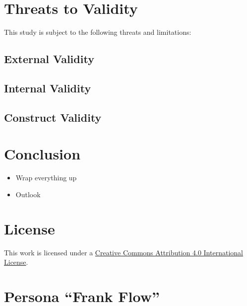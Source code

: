\documentclass[sigplan,screen,nonacm,review]{acmart}
\begin{document}
\section{Threats to Validity}
\label{sec:threats}

This study is subject to the following threats and limitations:

\subsection{External Validity}

\subsection{Internal Validity}

\subsection{Construct Validity}

\section{Conclusion}
\label{sec:conclusion}

\begin{itemize}
	\item Wrap everything up
	\item Outlook
\end{itemize}


\section*{License}
\ccby\thinspace\thinspace This work is licensed under a \href{https://creativecommons.org/licenses/by/4.0/}{Creative Commons Attribution 4.0 International License}.

\appendix





\section{Persona ``Frank Flow''}
\label{sec:persona}
\end{document}
